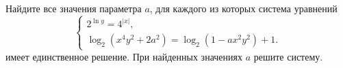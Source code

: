 \begin{ex}
	\begin{condition}
		Найдите все значения параметра \( a \), для каждого из которых система уравнений
		\[ \left\{
		\begin{array}{l}
			2^{\ln y}=4^{|x|},\\
			\log_2(x^4y^2+2a^2)=\log_2(1-ax^2y^2)+1.
		\end{array}
		\right. \] имеет единственное решение. При найденных значениях \( a \) решите систему.
	\end{condition}
\end{ex}